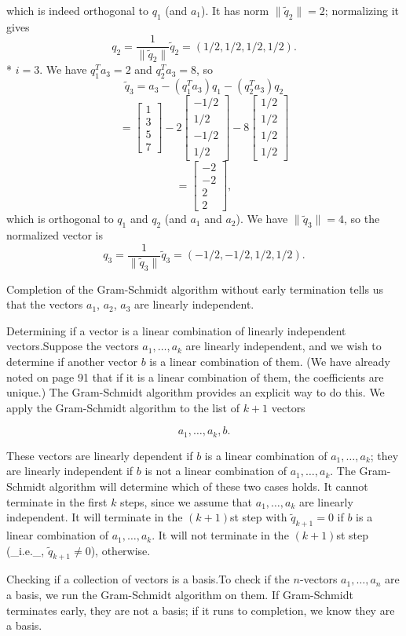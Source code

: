 which is indeed orthogonal to \(q_{1}\) (and \(a_{1}\)). It has norm \(\|\tilde{q}_{2}\|=2\); normalizing it gives \[q_{2}=\frac{1}{\|\tilde{q}_{2}\|}\tilde{q}_{2}=(1/2,1/2,1/2,1/2).\]
* \(i=3\). We have \(q_{1}^{T}a_{3}=2\) and \(q_{2}^{T}a_{3}=8\), so \[\tilde{q}_{3} = a_{3}-(q_{1}^{T}a_{3})q_{1}-(q_{2}^{T}a_{3})q_{2}\] \[= \left[\begin{array}{c}1\\ 3\\ 5\\ 7\end{array}\right]-2\left[\begin{array}{c}-1/2\\ 1/2\\ -1/2\\ 1/2\end{array}\right]-8\left[\begin{array}{c}1/2\\ 1/2\\ 1/2\\ 1/2\end{array}\right]\] \[= \left[\begin{array}{c}-2\\ -2\\ 2\\ 2\end{array}\right],\] which is orthogonal to \(q_{1}\) and \(q_{2}\) (and \(a_{1}\) and \(a_{2}\)). We have \(\|\tilde{q}_{3}\|=4\), so the normalized vector is \[q_{3}=\frac{1}{\|\tilde{q}_{3}\|}\tilde{q}_{3}=(-1/2,-1/2,1/2,1/2).\]

Completion of the Gram-Schmidt algorithm without early termination tells us that the vectors \(a_{1}\), \(a_{2}\), \(a_{3}\) are linearly independent.

Determining if a vector is a linear combination of linearly independent vectors.Suppose the vectors \(a_{1},\ldots,a_{k}\) are linearly independent, and we wish to determine if another vector \(b\) is a linear combination of them. (We have already noted on page 91 that if it is a linear combination of them, the coefficients are unique.) The Gram-Schmidt algorithm provides an explicit way to do this. We apply the Gram-Schmidt algorithm to the list of \(k+1\) vectors

\[a_{1},\ldots,a_{k},b.\]

These vectors are linearly dependent if \(b\) is a linear combination of \(a_{1},\ldots,a_{k}\); they are linearly independent if \(b\) is not a linear combination of \(a_{1},\ldots,a_{k}\). The Gram-Schmidt algorithm will determine which of these two cases holds. It cannot terminate in the first \(k\) steps, since we assume that \(a_{1},\ldots,a_{k}\) are linearly independent. It will terminate in the \((k+1)\)st step with \(\tilde{q}_{k+1}=0\) if \(b\) is a linear combination of \(a_{1},\ldots,a_{k}\). It will not terminate in the \((k+1)\)st step (_i.e._, \(\tilde{q}_{k+1}\neq 0\)), otherwise.

Checking if a collection of vectors is a basis.To check if the \(n\)-vectors \(a_{1},\ldots,a_{n}\) are a basis, we run the Gram-Schmidt algorithm on them. If Gram-Schmidt terminates early, they are not a basis; if it runs to completion, we know they are a basis.

 